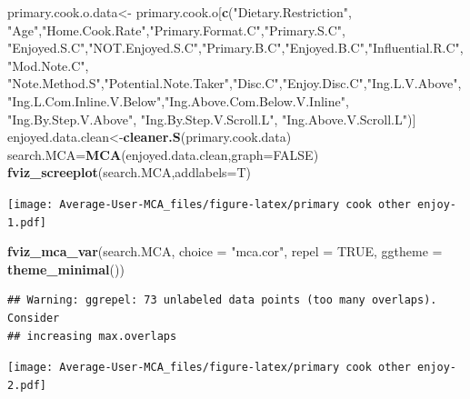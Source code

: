 \documentclass[
]{article}
\newenvironment{Shaded}{\begin{snugshade}}{\end{snugshade}}
\newcommand{\DataTypeTok}[1]{\textcolor[rgb]{0.13,0.29,0.53}{#1}}
\newcommand{\KeywordTok}[1]{\textcolor[rgb]{0.13,0.29,0.53}{\textbf{#1}}}
\newcommand{\NormalTok}[1]{#1}
\newcommand{\OtherTok}[1]{\textcolor[rgb]{0.56,0.35,0.01}{#1}}
\newcommand{\StringTok}[1]{\textcolor[rgb]{0.31,0.60,0.02}{#1}}
\begin{document}
\begin{Shaded}
\begin{Highlighting}[]
\NormalTok{primary.cook.o.data<-}\StringTok{ }\NormalTok{primary.cook.o[}\KeywordTok{c}\NormalTok{(}\StringTok{"Dietary.Restriction"}\NormalTok{, }\StringTok{"Age"}\NormalTok{,}\StringTok{"Home.Cook.Rate"}\NormalTok{,}\StringTok{"Primary.Format.C"}\NormalTok{,}\StringTok{"Primary.S.C"}\NormalTok{,}
            \StringTok{"Enjoyed.S.C"}\NormalTok{,}\StringTok{"NOT.Enjoyed.S.C"}\NormalTok{,}\StringTok{"Primary.B.C"}\NormalTok{,}\StringTok{"Enjoyed.B.C"}\NormalTok{,}\StringTok{"Influential.R.C"}\NormalTok{, }
            \StringTok{"Mod.Note.C"}\NormalTok{, }
            \StringTok{"Note.Method.S"}\NormalTok{,}\StringTok{"Potential.Note.Taker"}\NormalTok{,}\StringTok{"Disc.C"}\NormalTok{,}\StringTok{"Enjoy.Disc.C"}\NormalTok{,}\StringTok{"Ing.L.V.Above"}\NormalTok{,}
            \StringTok{"Ing.L.Com.Inline.V.Below"}\NormalTok{,}\StringTok{"Ing.Above.Com.Below.V.Inline"}\NormalTok{,  }\StringTok{"Ing.By.Step.V.Above"}\NormalTok{,  }\StringTok{"Ing.By.Step.V.Scroll.L"}\NormalTok{,}
            \StringTok{"Ing.Above.V.Scroll.L"}\NormalTok{)]}
\NormalTok{enjoyed.data.clean<-}\KeywordTok{cleaner.S}\NormalTok{(primary.cook.data)}
\NormalTok{search.MCA=}\KeywordTok{MCA}\NormalTok{(enjoyed.data.clean,}\DataTypeTok{graph=}\OtherTok{FALSE}\NormalTok{)}
\KeywordTok{fviz_screeplot}\NormalTok{(search.MCA,}\DataTypeTok{addlabels=}\NormalTok{T)}
\end{Highlighting}
\end{Shaded}

\texttt{[image: Average-User-MCA\_files/figure-latex/primary cook other enjoy-1.pdf]}

\begin{Shaded}
\begin{Highlighting}[]
\KeywordTok{fviz_mca_var}\NormalTok{(search.MCA, }\DataTypeTok{choice =} \StringTok{"mca.cor"}\NormalTok{, }\DataTypeTok{repel =} \OtherTok{TRUE}\NormalTok{,}
             \DataTypeTok{ggtheme =} \KeywordTok{theme_minimal}\NormalTok{())}
\end{Highlighting}
\end{Shaded}

\begin{verbatim}
## Warning: ggrepel: 73 unlabeled data points (too many overlaps). Consider
## increasing max.overlaps
\end{verbatim}

\texttt{[image: Average-User-MCA\_files/figure-latex/primary cook other enjoy-2.pdf]}
\end{document}
